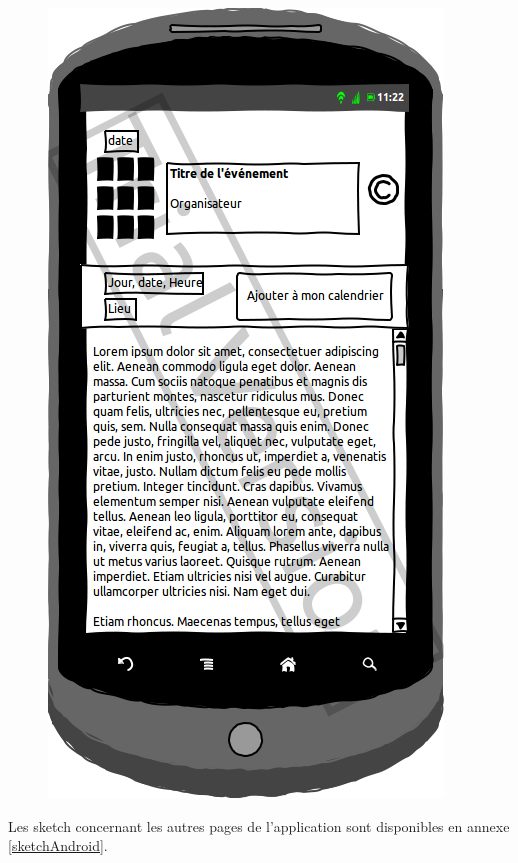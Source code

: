 \documentclass[a4paper, 11px]{article}
\begin{document}
\begin{figure}[htbp]
\begin{minipage}[c]{.50\linewidth}
\begin{center}
			\includegraphics[scale=0.3]{../../Sketch/Android/DescrEvent.png}
		\end{center}
	\end{minipage}
\end{figure}
Les sketch concernant les autres pages de l'application sont disponibles en annexe \ref{sketchAndroid}.
\vfill
\clearpage
\end{document}

